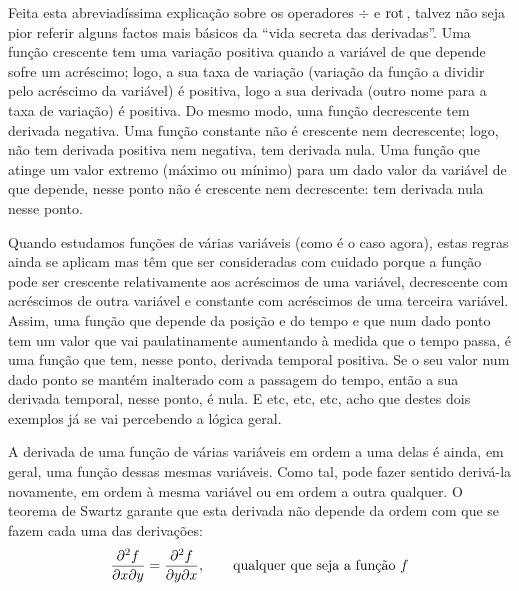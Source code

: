 {\small%
  Feita esta abreviadíssima explicação sobre os operadores $\div$ e $\text{rot}\,$,
  talvez não seja pior referir alguns factos mais básicos da ``vida secreta
  das derivadas''. Uma função crescente tem uma variação positiva quando a
  variável de que depende sofre um acréscimo; logo, a sua taxa de variação
  (variação da função a dividir pelo acréscimo da variável) é positiva, logo a
  sua derivada (outro nome para a taxa de variação) é positiva. Do mesmo modo,
  uma função decrescente tem derivada negativa. Uma função constante não é
  crescente nem decrescente; logo, não tem derivada positiva nem negativa, tem
  derivada nula.  Uma função que atinge um valor extremo (máximo ou mínimo) para
  um dado valor da variável de que depende, nesse ponto não é crescente nem
  decrescente: tem derivada nula nesse ponto.

  Quando estudamos funções de várias variáveis (como é o caso agora), estas
  regras ainda se aplicam mas têm que ser consideradas com cuidado porque a
  função pode ser crescente relativamente aos acréscimos de uma variável,
  decrescente com acréscimos de outra variável e constante com acréscimos de uma
  terceira variável. Assim, uma função que depende da posição e do tempo e que
  num dado ponto tem um valor que vai paulatinamente aumentando à medida que o
  tempo passa, é uma função que tem, nesse ponto, derivada temporal positiva. Se
  o seu valor num dado ponto se mantém inalterado com a passagem do tempo, então
  a sua derivada temporal, nesse ponto, é nula. E etc, etc, etc, acho que destes
  dois exemplos já se vai percebendo a lógica geral.

  A derivada de uma função de várias variáveis em ordem a uma delas é ainda, em
  geral, uma função dessas mesmas variáveis. Como tal, pode fazer sentido
  derivá-la novamente, em ordem à mesma variável ou em ordem a outra qualquer. O
  teorema de Swartz garante que esta derivada não depende da ordem com que se
  fazem cada uma das derivações:
  \begin{equation*}
    \frac{\partial^2 f}{\partial x\partial y}=
    \frac{\partial^2 f}{\partial y\partial x},\qquad\text{qualquer que seja a função $f$}
  \end{equation*}
}

